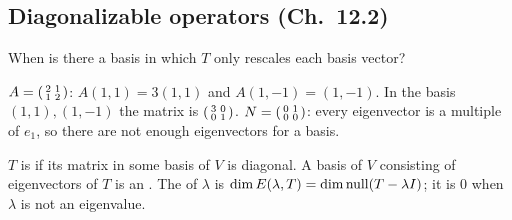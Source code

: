 \documentclass[10pt]{scrartcl}
\begin{document}
\subsection{Diagonalizable operators (Ch.~12.2)}

\begin{qbox}
  When is there a basis in which $T$ only rescales each basis vector?
  \begin{itemize}
    \ii $A=\begin{psmallmatrix}2&1\\1&2\end{psmallmatrix}$: $A(1,1)=3(1,1)$ and $A(1,-1)=(1,-1)$. In the basis $(1,1),(1,-1)$ the matrix is $\begin{psmallmatrix}3&0\\0&1\end{psmallmatrix}$.
    \ii $N=\begin{psmallmatrix}0&1\\0&0\end{psmallmatrix}$: every eigenvector is a multiple of $e_1$, so there are not enough eigenvectors for a basis.
  \end{itemize}
\end{qbox}

\begin{definition*}\hypertarget{def-34}{}\label{def-34}
  $T$ is  if its matrix in some basis of $V$ is diagonal. A basis of $V$ consisting of eigenvectors of $T$ is an . The  of $\lambda$ is $\dim E(\lambda,T)=\dim\operatorname{null}(T-\lambda I)$; it is $0$ when $\lambda$ is not an eigenvalue.
\end{definition*}
\end{document}
